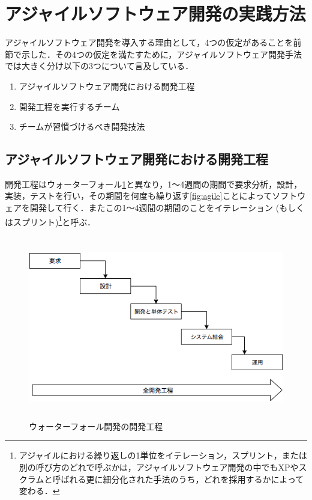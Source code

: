 \section{アジャイルソフトウェア開発の実践方法}

アジャイルソフトウェア開発を導入する理由として，4つの仮定があることを前節で示した．その4つの仮定を満たすために，アジャイルソフトウェア開発手法では大きく分け以下の3つについて言及している．

\begin{enumerate}
  \item アジャイルソフトウェア開発における開発工程
  \item 開発工程を実行するチーム
  \item チームが習慣づけるべき開発技法
\end{enumerate}

\subsection{アジャイルソフトウェア開発における開発工程}

開発工程はウォーターフォール\ref{fig:waterfall}と異なり，1〜4週間の期間で要求分析，設計，実装，テストを行い，その期間を何度も繰り返す\ref{fig:agile}ことによってソフトウェアを開発して行く．またこの1〜4週間の期間のことをイテレーション (もしくはスプリント)\footnote{アジャイルにおける繰り返しの1単位をイテレーション，スプリント，または別の呼び方のどれで呼ぶかは，アジャイルソフトウェア開発の中でもXPやスクラムと呼ばれる更に細分化された手法のうち，どれを採用するかによって変わる．}と呼ぶ．

\begin{figure}[H]
\centering
\includegraphics[height=8cm]{./assets/images/waterfall.png}
\caption{ウォーターフォール開発の開発工程}
\label{fig:waterfall}
\end{figure}

